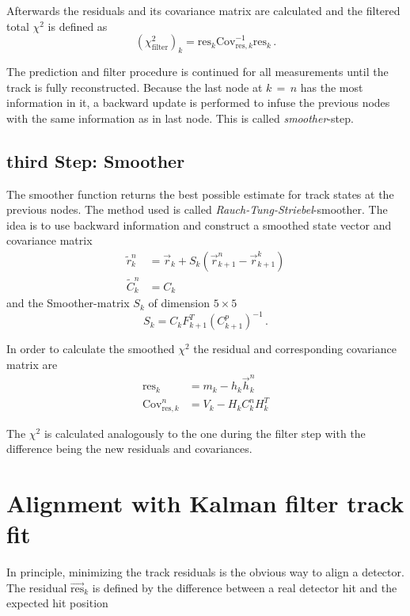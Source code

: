 Afterwards the residuals and its covariance matrix are calculated and the filtered total $\chi^2$ is defined as
\begin{equation*}
  \left( \chi^2_{\text{filter}} \right)_k = \text{res}_k \text{Cov}_{\text{res},k}^{-1} \text{res}_k\,.
\end{equation*}

The prediction and filter procedure is continued for all measurements until the track is fully reconstructed.
Because the last node at $k \, = \, n$ has the most information in it, a backward update is performed to infuse the previous nodes with the same information as in last node.
This is called \textit{smoother}-step.

\subsection{third Step: Smoother}
The smoother function returns the best possible estimate for track states at
the previous nodes. The method used is called \textit{Rauch-Tung-Striebel}-smoother\cite{RTS}.
The idea is to use backward information and construct a smoothed state vector and covariance matrix
\begin{align*}
  \tilde{r}_k^n &= \vec{r}_k + S_k \left( \vec{r}_{k+1}^n - \vec{r}_{k+1}^k \right) \\
  \tilde{C}_k^n &= C_k
\end{align*}
and the Smoother-matrix $S_k$ of dimension $5\times5$
\begin{equation*}
  S_k = C_k F_{k+1}^T \left( C_{k+1}^p \right)^{-1}\,.
\end{equation*}

In order to calculate the smoothed $\chi^2$ the residual and corresponding covariance matrix are
\begin{align*}
  \text{res}_k &= m_k - h_k \vec{h}_k^n \\
  \text{Cov}_{\text{res},k}^n &= V_k - H_k C_k^n H_k^T
\end{align*}

The $\chi^2$ is calculated analogously to the one during the filter step with the difference being the new residuals and covariances.

\section{Alignment with Kalman filter track fit}
\label{sec:derivatives}

In principle, minimizing the track residuals is the obvious way to align a detector.
The residual $\vec{\text{res}}_k$ is defined by the difference between a real detector hit and the expected hit position

